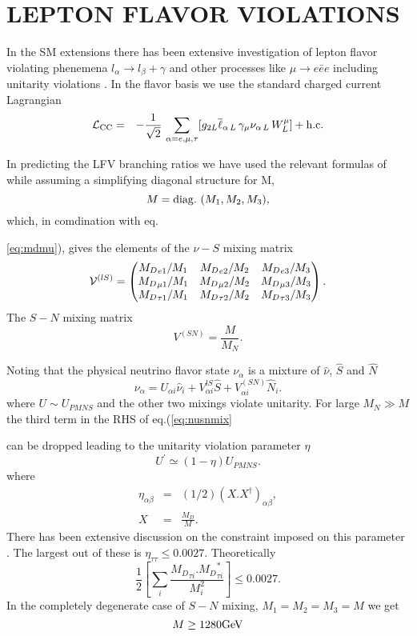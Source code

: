 \documentclass[a4paper,11pt]{article}
\newcommand{\be}{\begin{equation}}
\newcommand{\ee}{\end{equation}}
\newcommand{\bea}{\begin{eqnarray}}
\newcommand{\eea}{\end{eqnarray}}
\begin{document}
\section{\bf LEPTON FLAVOR VIOLATIONS}\label{sec:lfv}
In the SM extensions there has been extensive investigation of lepton
flavor violating phenemena $l_{\alpha} \to l_{\beta}+\gamma$ and other
processes like $\mu \to e{\bar e}e$  including
unitarity violations \cite{ilakovac,antbnd,non-unit}. In the flavor
basis we use the
standard charged current Lagrangian  
\begin{eqnarray}
\mathcal{L}_{\rm CC} &=& -\frac{1}{\sqrt{2}}\, \sum_{\alpha=e, \mu, \tau}
[g_{2L} \overline{\ell}_{\alpha \,L}\, \gamma_\mu {\nu}_{\alpha \,L}\, W^{\mu}_L] 
       + \text{h.c.} 
\label{eqn:ccint-flavor}
\end{eqnarray}

In  predicting the LFV
branching ratios  we have used the relevant formulas of
\cite{ilakovac}  while assuming a simplifying diagonal structure for
M,
\be
M = {\rm diag.}~(M_1, M_2, M_3),\label{eq:M}
\ee
which, in comdination with eq.{\ref{eq:mdmu}), gives the elements of the
  $\nu-S$ mixing matrix 
\bea
{\cal V}^{(lS)}=
\begin{pmatrix}
{M_D}_{e1}/M_1& {M_D}_{e2}/M_2&{M_D}_{e3}/M_3\\ 
{M_D}_{\mu 1}/M_1& {M_D}_{\mu 2}/M_2&{M_D}_{\mu 3}/M_3\\ 
{M_D}_{\tau 1}/M_1& {M_D}_{\tau 2}/M_2&{M_D}_{\tau 3}/M_3
\end{pmatrix}.
\label{HLMIX}
\eea
The $S-N$ mixing matrix 
\be
V^{(SN)}=\frac{M}{M_N}. \label{eq:mixsn} 
\ee

Noting that the physical neutrino flavor state $\nu_{\alpha}$ is a mixture of ${\hat \nu}$, ${\hat S}$ and ${\hat N}$
\be
 \nu_{\alpha}=U_{\alpha i}{\hat \nu}_i+V^{lS}_{\alpha i}{\hat S}
+V^{(SN)}_{\alpha i}{\hat N_i}.\label{eq:nusnmix}
\ee
where $U\sim U_{PMNS}$ and the other two mixings violate unitarity. For large $M_N\gg M$ the third term in the RHS of eq.(\ref{eq:nusnmix}} can be dropped leading to the unitarity violation parameter $\eta$
\be
U^{\prime}\simeq(1-\eta)U_{PMNS}.\label{eq:nonuni}
\ee
where
\bea
\eta_{\alpha\beta}&=&(1/2){(X.X^{\dagger})}_{\alpha\beta},\nonumber\\
X&=&\frac{M_D}{M}. \label{eq:X}
\eea
There has been extensive discussion on the constraint imposed on this
parameter
\cite{antbnd,non-unit}. The largest out of these is $\eta_{\tau \tau}\le 0.0027$. Theoretically
\be
\frac{1}{2}\left[\sum_i \frac{{M_D}_{\tau i}.{M_D}_{\tau i}^*}{M_i^2}\right]\le 0.0027.\label{eq:etanum}
\ee
In the completely degenerate case of $S-N$ mixing, $M_1=M_2=M_3=M$ we get
\be  
M\ge 1280 {\rm GeV} \label{eq:Mdeg}
\ee
\end{document}
